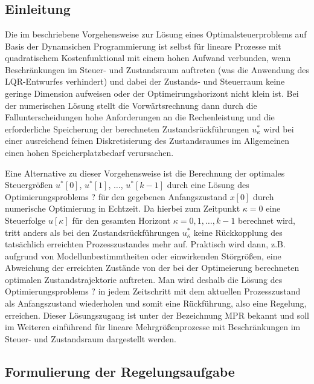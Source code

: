 \chapter{}
\section{Einleitung}
Die im  beschriebene Vorgehensweise zur Lösung eines Optimalsteuerproblems auf Basis der Dynamsichen Programmierung ist selbst für lineare
Prozesse mit quadratischem Kostenfunktional mit einem hohen Aufwand verbunden, wenn Beschränkungen im Steuer- und Zustandsraum auftreten (was die
Anwendung des \ac{LQR}-Entwurfes verhindert) und dabei der Zustands- und Steuerraum keine geringe Dimension aufweisen oder der Optimeirungshorizont
nicht klein ist. Bei der numerischen Lösung stellt die Vorwärtsrechnung dann durch die Fallunterscheidungen hohe Anforderungen an die Rechenleistung
und die erforderliche Speicherung der berechneten Zustandsrückführungen $u_{\kappa}^{\ast}$ wird bei einer ausreichend feinen Diskretisierung des
Zustandsraumes im Allgemeinen einen hohen Speicherplatzbedarf verursachen.

Eine Alternative zu dieser Vorgehensweise ist die Berechnung der optimales Steuergrößen $u^{\ast}[0]$, $u^{\ast}[1]$, $\ldots$, $u^{\ast}[k-1]$ durch eine Lösung des
Optimierungsproblems ? für den gegebenen Anfangszustand $x[0]$ durch numerische Optimierung in Echtzeit. Da hierbei zum Zeitpunkt $\kappa=0$ eine Steuerfolge $u[\kappa]$ für den
gesamten Horizont $\kappa=0,1,\ldots,k-1$ berechnet wird, tritt anders als bei den Zustandsrückführungen $u_{\kappa}^{\ast}$ keine Rückkopplung des tatsächlich erreichten
Prozesszustandes mehr auf. Praktisch wird dann, z.B. aufgrund von Modellunbestimmtheiten oder einwirkenden Störgrößen, eine Abweichung der erreichten Zustände von der bei der
Optimeierung berechneten optimalen Zustandstrajektorie auftreten. Man wird deshalb die Lösung des Optimierungsproblems ? in jedem Zeitschritt mit dem
aktuellen Prozesszustand als Anfangszustand wiederholen und somit eine Rückführung, also eine Regelung, erreichen. Dieser Lösungszugang ist unter der
Bezeichnung \ac{MPR} bekannt und soll im Weiteren einführend für lineare Mehrgrößenprozesse mit Beschränkungen im Steuer- und Zustandsraum dargestellt werden.

\section{Formulierung der Regelungsaufgabe}
